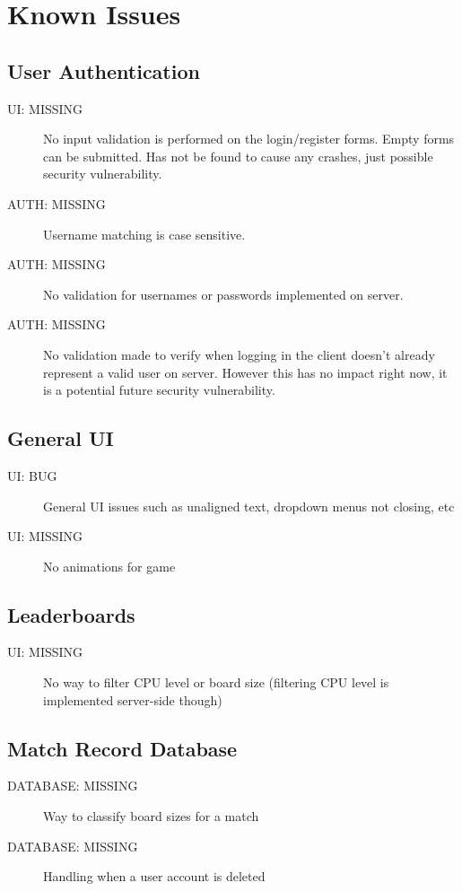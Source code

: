 \documentclass{article}
\begin{document}
\section{Known Issues}

\subsection{User Authentication}

\begin{description}
  \item[UI: MISSING] No input validation is performed on the login/register forms.  Empty forms can be submitted.  Has not be found to cause any crashes, just possible security vulnerability.
  \item[AUTH: MISSING] Username matching is case sensitive.
  \item[AUTH: MISSING] No validation for usernames or passwords implemented on server.
  \item[AUTH: MISSING] No validation made to verify when logging in the client doesn't already represent a valid user on server.  However this has no impact right now, it is a potential future security vulnerability.  
\end{description}

\subsection{General UI}

\begin{description}
  \item[UI: BUG] General UI issues such as unaligned text, dropdown menus not closing, etc
  \item[UI: MISSING] No animations for game
\end{description}

\subsection{Leaderboards}

\begin{description}
  \item[UI: MISSING] No way to filter CPU level or board size (filtering CPU level is implemented server-side though)
\end{description}

\subsection{Match Record Database}

\begin{description}
  \item[DATABASE: MISSING] Way to classify board sizes for a match
  \item[DATABASE: MISSING] Handling when a user account is deleted
\end{description}
\end{document}
